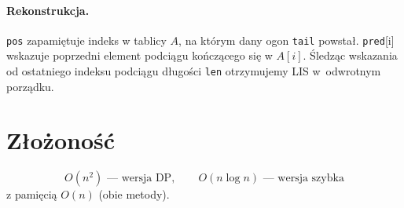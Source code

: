 \documentclass[11pt,a4paper]{article}
\begin{document}
\paragraph{Rekonstrukcja.}
\texttt{pos} zapamiętuje indeks w tablicy $A$,
na którym dany ogon \texttt{tail} powstał.
\texttt{pred}[i] wskazuje poprzedni element
podciągu kończącego się w $A[i]$.
Śledząc wskazania od ostatniego indeksu
podciągu długości \texttt{len}
otrzymujemy LIS w~odwrotnym porządku.

\section*{Złożoność}

\[
  O(n^2) \text{ — wersja DP},
  \qquad
  O(n\log n) \text{ — wersja szybka}
\]
z pamięcią $O(n)$ (obie metody).
\end{document}
